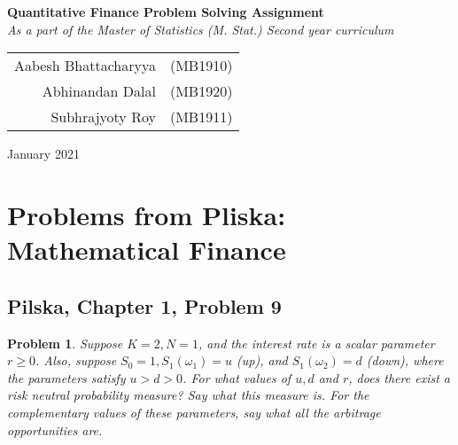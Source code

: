 \documentclass[12pt]{article}
\theoremstyle{problemstyle}
\newtheorem{pbm}{Problem}
\newenvironment{problem}{
\begin{tcolorbox}[colback=green!10!white,colframe=black!75!black, parbox = false]\begin{pbm} }{\end{pbm}\end{tcolorbox} }
\begin{document}
\begin{titlepage}
\centering
\vspace*{5cm}
\Huge{\textbf{Quantitative Finance Problem Solving Assignment}}\\
\vspace*{1cm}
\Large{\textit{As a part of the Master of Statistics (M. Stat.) Second year curriculum}}\\
\vspace*{2cm}
\begin{large}
\begin{tabular}{rr}
Aabesh Bhattacharyya & (MB1910)\\
Abhinandan Dalal & (MB1920)\\
Subhrajyoty Roy & (MB1911)
\end{tabular}
\end{large}
\vspace*{2cm}
\begin{flushright}
    January 2021
\end{flushright}
\vfill
\end{titlepage}

\tableofcontents
\newpage

\section{Problems from Pliska: Mathematical Finance}

\subsection{Pilska, Chapter 1, Problem 9}
\begin{problem}
Suppose $K = 2, N = 1$, and the interest rate is a scalar parameter $r \geq 0$. Also, suppose $S_0 = 1, S_1(\omega_1) = u$ (up), and $S_1(\omega_2) = d$ (down), where the parameters satisfy $u > d > 0$. For what values of $u, d$ and $r$, does there exist a risk neutral probability measure? Say what this measure is. For the complementary values of these
parameters, say what all the arbitrage opportunities are.  
\end{problem}
\end{document}
